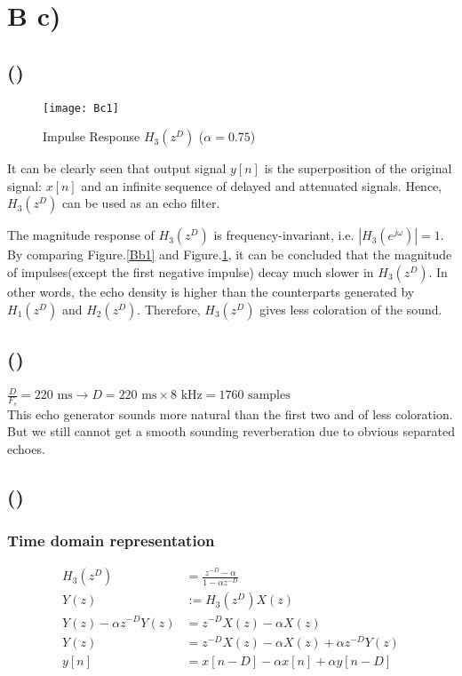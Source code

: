 \documentclass{article}
\newenvironment{homeworkProblem}[1]{
	\section*{#1}
	}{
}
\newenvironment{homeworkSection}[1]{
	\subsection*{#1}
	}{
}
\begin{document}
\begin{homeworkProblem}{B c)}

\begin{homeworkSection}{()}

\begin{figure}[H]
\centering
\texttt{[image: Bc1]}
\caption{Impulse Response $H_3(z^D)$ ($\alpha=0.75$)}
\label{Bc1}
\end{figure}

It can be clearly seen that output signal $y[n]$ is the superposition of the original signal: $x[n]$ and an infinite sequence of delayed and attenuated signals. Hence, $H_3(z^D)$ can be used as an echo filter.

The magnitude response of $H_3(z^D)$ is frequency-invariant, i.e. $|H_3(e^{j\omega})|=1$.\\

By comparing Figure.\ref{Bb1} and Figure.\ref{Bc1}, it can be concluded that the magnitude of impulses(except the first negative impulse) decay much slower in $H_3(z^D)$. In other words, the echo density is higher than the counterparts generated by $H_1(z^D)$ and $H_2(z^D)$. Therefore, $H_3(z^D)$ gives less coloration of the sound.

\end{homeworkSection}


\begin{homeworkSection}{()}

$\frac{D}{F_s}=\text{220 ms} \longrightarrow D = 220 \text{ ms} \times 8\text{ kHz} = 1760 \text{ samples}$\\

This echo generator sounds more natural than the first two and of less coloration. But we still cannot get a smooth sounding reverberation due to obvious separated echoes.

\end{homeworkSection}


\begin{homeworkSection}{()}

\subsubsection*{Time domain representation}
\begin{align*}
H_3(z^D) &= \frac{z^{-D}-\alpha}{1 - \alpha z^{-D}}\\
Y(z) &:= H_3(z^D) X(z)\\
Y(z) - \alpha z^{-D} Y(z) &= z^{-D} X(z) - \alpha X(z)\\
Y(z) &= z^{-D} X(z) - \alpha X(z) + \alpha z^{-D} Y(z)\\
y[n] &= x[n-D] - \alpha x[n] + \alpha y[n-D]
\end{align*}

\end{homeworkSection}


\end{homeworkProblem}
\end{document}
